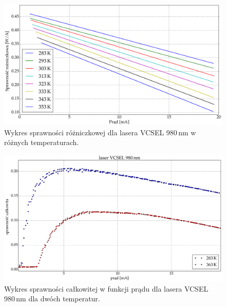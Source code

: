 \begin{figure}
\center
  \includegraphics[scale=0.25]{plot980/plot_eff_via_current_all.eps}
  \caption{Wykres sprawności różniczkowej dla lasera VCSEL 980\,nm w różnych temperaturach.}
  \label{fig:plot_eff_via_current_all_980}
\end{figure}
\begin{figure}
\center
  \includegraphics[scale=0.25]{plot980/plot_wall_eff.eps}
  \caption{Wykres sprawności całkowitej w funkcji prądu dla lasera VCSEL 980\,nm dla dwóch temperatur.}
  \label{fig:plot_wall_eff_980}
\end{figure}